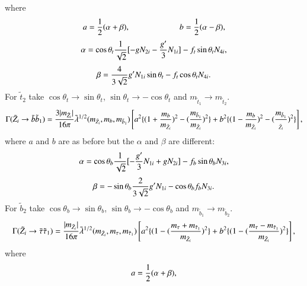 \documentclass[final,3p,times]{elsarticle}
\begin{document}
where
\begin{equation}
a = {1 \over 2}(\alpha+\beta), \:  \:   \: \: \:  \: \:\:  \: \: \:  \: \: \:  \: \: \:  \: \: \:  \: \: \:  \: \: \: \:  b = {1 \over 2}(\alpha-\beta),
\end{equation}
\begin{equation}
\alpha = \cos \theta_t {1 \over \sqrt{2}} [-g N_{2i} - {g' \over 3} N_{1i}] - f_t \sin \theta_t N_{4i},
\end{equation}
\begin{equation}
\beta = {4 \over 3\sqrt{2}} g' N_{1i} \sin \theta_t - f_t \cos \theta_t N_{4i}.
\end{equation}
For $\tilde{t}_2$ take $\cos\theta_t \rightarrow \sin\theta_t$, $\sin\theta_t \rightarrow -\cos\theta_t$ and $m_{\tilde{t}_1} \rightarrow m_{\tilde{t}_2}$.
\begin{equation}\label{neutbsb1}
\Gamma (\tilde{Z}_i \rightarrow \bar{b} \tilde{b}_{1}) = {3 |m_{\tilde{Z}_i}| \over 16\pi} \tilde{\lambda}^{1/2} (m_{\tilde{Z}_i}, m_b, m_{\tilde{b}_{1}}) \left[a^2\{(1+{m_b \over m_{\tilde{Z}_i}})^2 - ({m_{\tilde{b}_1} \over m_{\tilde{Z}_i}})^2\} + b^2\{(1-{m_b \over m_{\tilde{Z}_i}})^2 - ({m_{\tilde{b}_1} \over _{\tilde{Z}_i}})^2\}\right],
\end{equation} 
where $a$ and $b$ are as before but the $\alpha$ and $\beta$ are different:
\begin{equation}
\alpha = \cos \theta_b {1 \over \sqrt{2}} [-{g' \over 3} N_{1i} + g N_{2i}] - f_b \sin \theta_b N_{3i},
\end{equation}
\begin{equation}
\beta = -\sin \theta_b {2 \over 3\sqrt{2}}g' N_{1i}  - \cos \theta_b f_b N_{3i}.
\end{equation}
For $\tilde{b}_2$ take $\cos\theta_b \rightarrow \sin\theta_b$, $\sin\theta_b \rightarrow -\cos\theta_b$ and 	$m_{\tilde{b}_1} \rightarrow m_{\tilde{b}_2}$.
\begin{equation}\label{neuttaustau1}
\Gamma (\tilde{Z}_i \rightarrow \bar{\tau} \tilde{\tau}_{1}) = {|m_{\tilde{Z}_i}| \over 16\pi} \tilde{\lambda}^{1/2} (m_{\tilde{Z}_i}, m_\tau, m_{\tilde{\tau}_{1}}) \left[ a^2\{(1-({m_\tau + m_{\tilde{\tau}_1} \over m_{\tilde{Z}_i}})^2\} + b^2\{(1-({m_\tau - m_{\tilde{\tau}_1} \over m_{\tilde{Z}_i}})^2\} \right],
\end{equation} 
where
\begin{equation}
a = {1 \over 2} (\alpha + \beta) ,
\end{equation}
\end{document}
